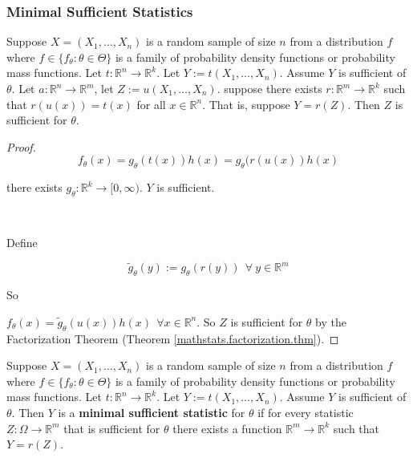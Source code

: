 \subsubsection{Minimal Sufficient Statistics}

\begin{proposition}

Suppose \(X = (X_1, \ldots, X_n)\) is a random sample of size \(n\) from a distribution \(f\) where \(f \in \{f_\theta: \theta \in \Theta \}\) is a family of probability density functions or probability mass functions. Let \(t: \mathbb{R}^n \to \mathbb{R}^k\). Let \(Y:= t(X_1, \ldots, X_n)\). Assume \(Y\) is sufficient of \(\theta\). Let \(a: \mathbb{R}^n \to \mathbb{R}^m\), let \(Z:=u(X_1, \ldots, X_n)\). suppose there exists \(r: \mathbb{R}^m \to \mathbb{R}^k\) such that \(r(u(x)) = t(x)\) for all \(x \in \mathbb{R}^n\). That is, suppose \(Y = r(Z)\). Then \(Z\) is sufficient for \(\theta\).

\end{proposition}

\begin{proof}

\[
f_\theta(x) = g_\theta(t(x)) h(x) = g_\theta(r(u(x)) h(x)
\]


there exists \(g_\theta: \mathbb{R}^k \to [0, \infty)\). \(Y\) is sufficient.

\

Define 

\[
\tilde{g}_\theta(y) := g_\theta(r(y)) \ \ \forall \ y \in \mathbb{R}^m
\]

So

\(f_\theta(x) = \tilde{g}_\theta(u(x)) h(x) \ \ \forall x \in \mathbb{R}^n\). So \(Z\) is sufficient for \(\theta\) by the Factorization Theorem (Theorem \ref{mathstats.factorization.thm}).

\end{proof}

\begin{definition} Suppose \(X = (X_1, \ldots, X_n)\) is a random sample of size \(n\) from a distribution \(f\) where \(f \in \{f_\theta: \theta \in \Theta \}\) is a family of probability density functions or probability mass functions. Let \(t: \mathbb{R}^n \to \mathbb{R}^k\). Let \(Y:= t(X_1, \ldots, X_n)\). Assume \(Y\) is sufficient of \(\theta\). Then \(Y\) is a \textbf{minimal sufficient statistic} for \(\theta\) if for every statistic \(Z: \Omega \to \mathbb{R}^m\) that is sufficient for \(\theta\) there exists a function \(\mathbb{R}^m \to \mathbb{R}^k\) such that \(Y = r(Z)\).

\end{definition}

